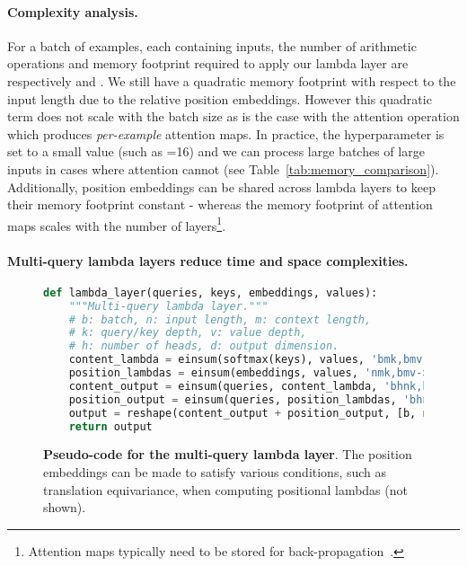 \documentclass{article} \usepackage{iclr2021_conference,times}
\begin{document}
\paragraph{Complexity analysis.}
For a batch of  examples, each containing  inputs, the number of arithmetic operations and memory footprint required to apply our lambda layer
are respectively  and .
We still have a quadratic memory footprint with respect to the input length due to the  relative position embeddings.
However this quadratic term does not scale with the batch size as is the case with the attention operation which produces \emph{per-example} attention maps.
In practice, the hyperparameter  is set to a small value (such as =16) and we can process large batches of large inputs in cases where attention cannot (see Table~\ref{tab:memory_comparison}).
Additionally, position embeddings can be shared across lambda layers to keep their  memory footprint constant - whereas the memory footprint of attention maps scales with the number of layers\footnote{Attention maps typically need to be stored for back-propagation~\citep{kitaev2020reformer}.}.

\vspace{-0.1cm}
\paragraph{Multi-query lambda layers reduce time and space complexities.}
\begin{figure}[h]
\small
\begin{lstlisting}[language=python]
def lambda_layer(queries, keys, embeddings, values):
    """Multi-query lambda layer."""
    # b: batch, n: input length, m: context length,
    # k: query/key depth, v: value depth,
    # h: number of heads, d: output dimension.
    content_lambda = einsum(softmax(keys), values, 'bmk,bmv->bkv')
    position_lambdas = einsum(embeddings, values, 'nmk,bmv->bnkv')
    content_output = einsum(queries, content_lambda, 'bhnk,bkv->bnhv')
    position_output = einsum(queries, position_lambdas, 'bhnk,bnkv->bnhv')
    output = reshape(content_output + position_output, [b, n, d])
    return output
\end{lstlisting}
    \caption{
    \textbf{Pseudo-code for the multi-query lambda layer}.
    The position embeddings can be made to satisfy various conditions, such as translation equivariance, when computing positional lambdas (not shown).
    }
    \label{fig:lambda_layer_code}
    \vspace{-0.25cm}
\end{figure}
\end{document}
